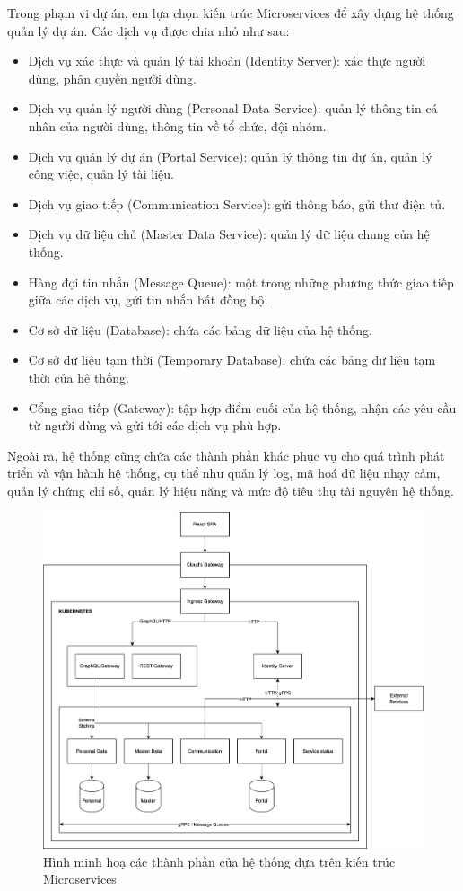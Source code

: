 \documentclass[../DoAn.tex]{subfiles}
\begin{document}
Trong phạm vi dự án, em lựa chọn kiến trúc Microservices để xây dựng hệ thống quản lý dự án. Các dịch vụ được chia nhỏ như sau:
\begin{itemize}
    \item Dịch vụ xác thực và quản lý tài khoản (Identity Server): xác thực người dùng, phân quyền người dùng.
    \item Dịch vụ quản lý người dùng (Personal Data Service): quản lý thông tin cá nhân của người dùng, thông tin về tổ chức, đội nhóm.
    \item Dịch vụ quản lý dự án (Portal Service): quản lý thông tin dự án, quản lý công việc, quản lý tài liệu.
    \item Dịch vụ giao tiếp (Communication Service): gửi thông báo, gửi thư điện tử.
    \item Dịch vụ dữ liệu chủ (Master Data Service): quản lý dữ liệu chung của hệ thống.
    \item Hàng đợi tin nhắn (Message Queue): một trong những phương thức giao tiếp giữa các dịch vụ, gửi tin nhắn bất đồng bộ.
    \item Cơ sở dữ liệu (Database): chứa các bảng dữ liệu của hệ thống.
    \item Cơ sở dữ liệu tạm thời (Temporary Database): chứa các bảng dữ liệu tạm thời của hệ thống.
    \item Cổng giao tiếp (Gateway): tập hợp điểm cuối của hệ thống, nhận các yêu cầu từ người dùng và gửi tới các dịch vụ phù hợp.
\end{itemize}

Ngoài ra, hệ thống cũng chứa các thành phần khác phục vụ cho quá trình phát triển và vận hành hệ thống, cụ thể như quản lý log, mã hoá dữ liệu nhạy cảm, quản lý chứng chỉ số,
quản lý hiệu năng và mức độ tiêu thụ tài nguyên hệ thống.

\begin{figure}[H]
    \centering
    \includegraphics[width=1.0\linewidth]{Hinhve/MicroserviceArchitecture.png}
    \caption{Hình minh hoạ các thành phần của hệ thống dựa trên kiến trúc Microservices}
    \label{fig:MicroserviceArchitecture}
\end{figure}
\newpage
\end{document}
